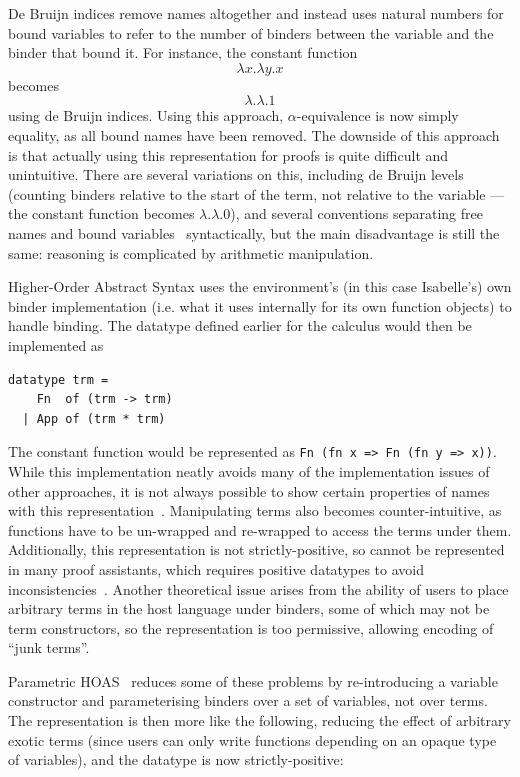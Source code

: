 De Bruijn indices remove names altogether and instead uses natural numbers for bound variables to refer to the number of binders between the variable and the binder that bound it.
For instance, the constant function
\[
\lambda x. \lambda y. x
\]
becomes
\[
\lambda.\lambda. 1
\]
using de Bruijn indices.
Using this approach, \(\alpha\)-equivalence is now simply equality, as all bound names have been removed.
The downside of this approach is that actually using this representation for proofs is quite difficult and unintuitive.
There are several variations on this, including de Bruijn levels (counting binders relative to the start of the term, not relative to the variable --- the constant function becomes \(\lambda.\lambda. 0\)), and several conventions separating free names and bound variables~\cite{i-am-a-free-variable} syntactically, but the main disadvantage is still the same: reasoning is complicated by arithmetic manipulation.

Higher-Order Abstract Syntax uses the environment's (in this case Isabelle's) own binder implementation (i.e. what it uses internally for its own function objects) to handle binding.
The datatype defined earlier for the calculus would then be implemented as
\begin{verbatim}
datatype trm =
    Fn  of (trm -> trm)
  | App of (trm * trm)
\end{verbatim}
The constant function would be represented as \texttt{Fn (fn x => Fn (fn y => x))}.
While this implementation neatly avoids many of the implementation issues of other approaches, it is not always possible to show certain properties of names with this representation~\cite{HOAS}.
Manipulating terms also becomes counter-intuitive, as functions have to be un-wrapped and re-wrapped to access the terms under them.
Additionally, this representation is not strictly-positive, so cannot be represented in many proof assistants, which requires positive datatypes to avoid inconsistencies~\cite{inductive-types}.
Another theoretical issue arises from the ability of users to place arbitrary terms in the host language under binders, some of which may not be term constructors, so the representation is too permissive, allowing encoding of ``junk terms''.

Parametric HOAS~\cite{PHOAS} reduces some of these problems by re-introducing a variable constructor and parameterising binders over a set of variables, not over terms.
The representation is then more like the following, reducing the effect of arbitrary exotic terms (since users can only write functions depending on an opaque type of variables), and the datatype is now strictly-positive:

